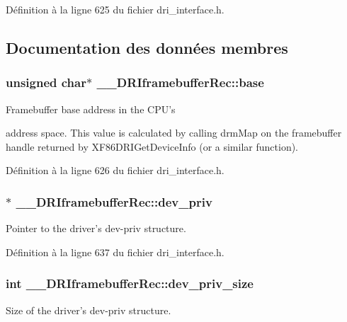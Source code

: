 Définition à la ligne 625 du fichier dri\-\_\-interface.\-h.



\subsection{Documentation des données membres}
\hypertarget{struct_____d_r_iframebuffer_rec_ad4b7d037cf68bf62da49568e6826a2d6}{
\subsubsection[{base}]{\setlength{\rightskip}{0pt plus 5cm}unsigned char$\ast$ \-\_\-\-\_\-\-D\-R\-Iframebuffer\-Rec\-::base}}\label{struct_____d_r_iframebuffer_rec_ad4b7d037cf68bf62da49568e6826a2d6}
\begin{DoxyVerb}                 Framebuffer base address in the CPU's
\end{DoxyVerb}
 address space. This value is calculated by calling {\ttfamily drm\-Map} on the framebuffer handle returned by {\ttfamily X\-F86\-D\-R\-I\-Get\-Device\-Info} (or a similar function). 

Définition à la ligne 626 du fichier dri\-\_\-interface.\-h.

\hypertarget{struct_____d_r_iframebuffer_rec_af315b382c3a95a2acbddd5ed8157bfad}{
\subsubsection[{dev\-\_\-priv}]{$\ast$ \-\_\-\-\_\-\-D\-R\-Iframebuffer\-Rec\-::dev\-\_\-priv}}\label{struct_____d_r_iframebuffer_rec_af315b382c3a95a2acbddd5ed8157bfad}
Pointer to the driver's dev-\/priv structure. 

Définition à la ligne 637 du fichier dri\-\_\-interface.\-h.

\hypertarget{struct_____d_r_iframebuffer_rec_a0bfbde5e050baa8aa3450a60ce51a85d}{
\subsubsection[{dev\-\_\-priv\-\_\-size}]{\setlength{\rightskip}{0pt plus 5cm}int \-\_\-\-\_\-\-D\-R\-Iframebuffer\-Rec\-::dev\-\_\-priv\-\_\-size}}\label{struct_____d_r_iframebuffer_rec_a0bfbde5e050baa8aa3450a60ce51a85d}
Size of the driver's dev-\/priv structure. 

